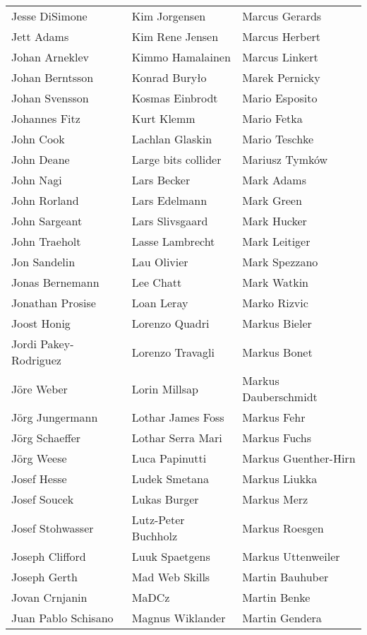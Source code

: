 \begin{tabular}{p{4cm}p{4cm}p{4cm}}
Jesse DiSimone & Kim Jorgensen & Marcus Gerards \\
Jett Adams & Kim Rene Jensen & Marcus Herbert \\
Johan Arneklev & Kimmo Hamalainen & Marcus Linkert \\
Johan Berntsson & Konrad Buryło & Marek Pernicky \\
Johan Svensson & Kosmas Einbrodt & Mario Esposito \\
Johannes Fitz & Kurt Klemm & Mario Fetka \\
John Cook & Lachlan Glaskin & Mario Teschke \\
John Deane & Large bits collider & Mariusz Tymków \\
John Nagi & Lars Becker & Mark Adams \\
John Rorland & Lars Edelmann & Mark Green \\
John Sargeant & Lars Slivsgaard & Mark Hucker \\
John Traeholt & Lasse Lambrecht & Mark Leitiger \\
Jon Sandelin & Lau Olivier & Mark Spezzano \\
Jonas Bernemann & Lee Chatt & Mark Watkin \\
Jonathan Prosise & Loan Leray & Marko Rizvic \\
Joost Honig & Lorenzo Quadri & Markus Bieler \\
Jordi Pakey-Rodriguez & Lorenzo Travagli & Markus Bonet \\
Jöre Weber & Lorin Millsap & Markus Dauberschmidt \\
Jörg Jungermann & Lothar James Foss & Markus Fehr \\
Jörg Schaeffer & Lothar Serra Mari & Markus Fuchs \\
Jörg Weese & Luca Papinutti & Markus Guenther-Hirn \\
Josef Hesse & Ludek Smetana & Markus Liukka \\
Josef Soucek & Lukas Burger & Markus Merz \\
Josef Stohwasser & Lutz-Peter Buchholz & Markus Roesgen \\
Joseph Clifford & Luuk Spaetgens & Markus Uttenweiler \\
Joseph Gerth & Mad Web Skills & Martin Bauhuber \\
Jovan Crnjanin & MaDCz & Martin Benke \\
Juan Pablo Schisano & Magnus Wiklander & Martin Gendera \\

\end{tabular}
